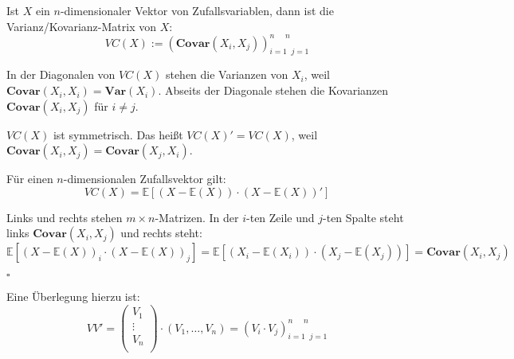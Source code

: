 \documentclass[10pt]{article}
\newcommand{\EW}{\mathbb{E}} %
\newcommand{\Var}{\textbf{Var}} %
\newenvironment{BWS}[1][]
{\begin{Beweis}[frametitle=#1]}{\end{Beweis}}
\begin{document}
			\begin{Definition}
				Ist $X$ ein $n$-dimensionaler Vektor von Zufallsvariablen, dann ist die Varianz/Kovarianz-Matrix von $X$:
				\begin{equation*}
					VC(X) := (\textbf{Covar}(X_i, X_j)) ^{n \;\; \; \; \;n}_{i=1 \;\; j=1}
				\end{equation*}
			\end{Definition}
			
			\begin{Bemerkung}
				In der Diagonalen von $VC(X)$ stehen die Varianzen von $X_i$, weil $\textbf{Covar}(X_i,X_i) = \Var(X_i)$. Abseits der Diagonale stehen die Kovarianzen $\textbf{Covar}(X_i, X_j)$ für $i \neq j$.
				
				$VC(X)$ ist symmetrisch. Das heißt $VC(X)' = VC(X)$, weil $\textbf{Covar}(X_i, X_j) = \textbf{Covar}(X_j, X_i)$.
			\end{Bemerkung}
			\begin{Proposition}
				Für einen $n$-dimensionalen Zufallsvektor gilt:
				\begin{equation*}
					VC(X) = \EW[(X-\EW(X)) \cdot (X-\EW(X))']
				\end{equation*}
			\end{Proposition}
			\begin{BWS}[Beweis 3.0.2 (Varianz/Kovarianz-Matrix)]
				Links und rechts stehen $m \times n$-Matrizen. In der $i$-ten Zeile und $j$-ten Spalte steht links $\textbf{Covar}(X_i, X_j)$ und rechts steht:
				\begin{equation*}
					\EW[(X-\EW(X))_i \cdot (X-\EW(X))_j] = \EW[(X_i-\EW(X_i)) \cdot (X_j-\EW(X_j))] = \textbf{Covar}(X_i, X_j) 
				\end{equation*}
				\begin{flushright}
					$\square$
				\end{flushright}
				Eine Überlegung hierzu ist:
				\begin{equation*}
					VV' =  \left(
					\begin{array}{c}
						V_1\\
						\vdots\\
						V_n\\
					\end{array}
					\right) \cdot (V_1, \ldots, V_n) = (V_i \cdot V_j)^{n \;\; \; \; \;n}_{i=1 \;\; j=1}
				\end{equation*}
			\end{BWS}
\end{document}
